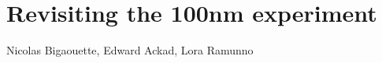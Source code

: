 
\newcommand{\PaperTitleHundrednm}{Revisiting the 100nm experiment}

\section{\PaperTitleHundrednm}
\label{section:papers:100nm}

\begin{flushright}
Nicolas Bigaouette, Edward Ackad, Lora Ramunno
\end{flushright}


% 
